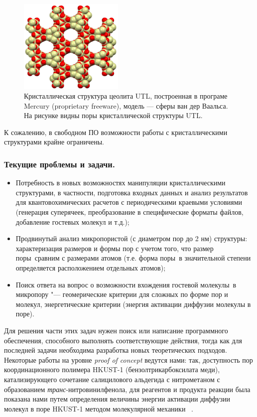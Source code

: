 \documentclass[10pt, a5paper]{article}
\begin{document}
\begin{figure}[h!]
  \centering
  \includegraphics[width=5cm]{20_2016_Litvenenka6.png}
  \caption{Кристаллическая структура цеолита UTL, построенная в програме Mercury (proprietary freeware), модель — сферы ван дер Ваальса. На рисунке видны поры кристаллической структуры UTL.}
  \label{Litvenenka6}
\end{figure} 
К сожалению, в свободном ПО возможности работы с кристаллическими структурами крайне ограничены.

\subsubsection*{Текущие проблемы и задачи.}

\begin{itemize}
  \item Потребность в новых возможностях манипуляции кристаллическими структурами, в частности, подготовка входных данных и анализ результатов для квантовохимических расчетов с периодическими краевыми условиями (генерация суперячеек, преобразование в специфические форматы файлов, добавление гостевых молекул и т.д.);
  \item Продвинутый анализ микропористой (с диаметром пор до 2 нм) структуры: характеризация размеров и формы пор с учетом того, что размер поры сравним с размерами атомов (т.е. форма поры в значительной степени определяется расположением отдельных атомов);
  \item Поиск ответа на вопрос о возможности вхождения гостевой молекулы в микропору "--- геомерические критерии для сложных по форме пор и молекул, энергетические критерии (энергия активации диффузии молекулы в поре).
\end{itemize}

Для решения части этих задач нужен поиск или написание программного обеспечения, способного выполнять соответствующие \linebreak действия, тогда как для последней задачи необходима разработка новых теоретических подходов. Некоторые работы на уровне \emph{proof of concept} ведутся нами: так, доступность пор координационного полимера HKUST-1 (бензолтрикарбоксилата меди), катализирующего сочетание салицилового альдегида с нитрометаном с образованием \emph{транс}-нитровинилфенола, для реагентов и продукта реакции была показана нами путем определения величины энергии активации диффузии молекул в поре HKUST-1 методом молекулярной механики ~\cite{Litvenenka5}.
\end{document}

